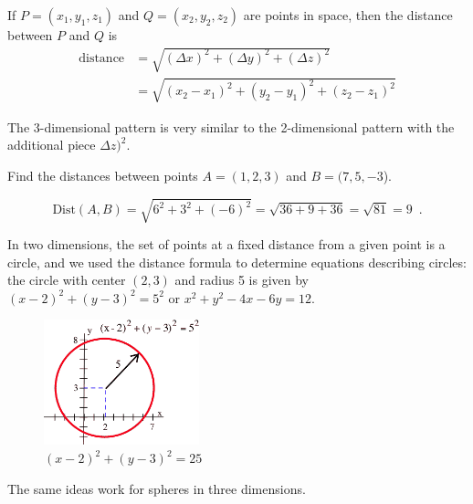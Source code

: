 \begin{theorem}
If $P=(x_1,y_1,z_1)$ and $Q=(x_2,y_2,z_2)$ are points in space, then the distance between $P$ and $Q$ is
\begin{align*}
\mbox{distance} &= \sqrt{(\Delta x)^2 + (\Delta y)^2 + (\Delta z)^2} \\
                &= \sqrt{(x_2-x_1)^2 + (y_2-y_1)^2 + (z_2-z_1)^2}
\end{align*}
\end{theorem}

The 3-dimensional pattern is very similar to the 2-dimensional pattern with the additional piece $\Delta z)^2$.

\begin{example}
Find the distances between points $A=(1,2,3)$ and $B=(7,5,-3$).

\begin{solution}
  $$\mbox{Dist}(A,B) = \sqrt{6^2+3^2+(-6)^2} = \sqrt{36+9+36} = \sqrt{81} = 9 \enspace .$$
\end{solution}\end{example}

In two dimensions, the set of points at a fixed distance from a given point is a circle, and we used the distance formula to determine equations describing circles: the circle with center $(2, 3)$ and radius 5 is given by $(x-2)^2 + (y-3)^2 = 5^2$ or $x^2+y^2-4x-6y = 12$.

\begin{figure}[!ht]
  \centering
    \includegraphics[width=0.4\textwidth]{img/chap4/image012.png}
    \caption{$(x-2)^2+(y-3)^2 = 25$}
    \label{fig:4-1-circle}
\end{figure}
The same ideas work for spheres in three dimensions.

